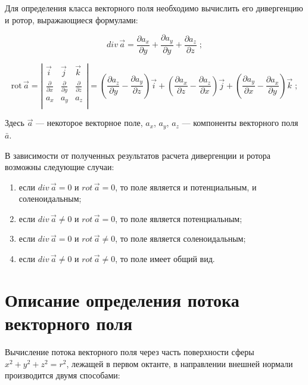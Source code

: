 \documentclass[14pt,a4paper,final]{extreport}
\begin{document}
Для определения класса векторного поля необходимо вычислить его дивергенцию и ротор, выражающиеся формулами:

\[ div \, \vec a = \frac{\partial a_x}{\partial y} + \frac{\partial a_y}{\partial y} + \frac{\partial a_z}{\partial z} \;; \]

\[ \mathrm{rot} \, \vec a = \left| \begin{matrix}
								\vec i & \vec j & \vec k \\
								\frac{\partial}{\partial x} & \frac{\partial}{\partial y} & \frac{\partial}{\partial z} \\
								a_x & a_y & a_z \\
								\end{matrix} \right|
= (\frac{\partial a_z}{\partial y} - \frac{\partial a_y}{\partial z})\vec i + (\frac{\partial a_x}{\partial z} - \frac{\partial a_z}{\partial x})\vec j + (\frac{\partial a_y}{\partial x} - \frac{\partial a_x}{\partial y})\vec k \;; \]

Здесь $\vec{a}$ --- некоторое векторное поле, $a_{x}$, $a_{y}$, $a_{z}$ --- компоненты векторного поля $\bar{a}$.


В зависимости от полученных результатов расчета дивергенции и ротора возможны следующие случаи:


\begin{enumerate}
	\item  если $div \, \vec a=0$ и $rot\,\vec{a}=0$, то поле является и потенциальным, и соленоидальным;
	\item  если $div \, \vec a\neq0$ и $rot\,\vec{a}=0$, то поле является потенциальным;
	\item  если $div \, \vec a=0$ и $rot\,\vec{a}\neq0$, то поле является соленоидальным;
	\item  если $div \, \vec a\neq0$ и $rot\,\vec{a}\neq0$, то поле имеет общий вид.
\end{enumerate}

\section{Описание определения потока векторного поля}

Вычисление потока векторного поля через часть поверхности сферы $x^2+y^2+z^2=r^2$, лежащей в первом октанте, в направлении внешней нормали производится двумя способами:
\end{document}
